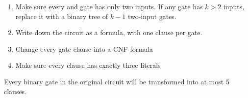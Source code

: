 \begin{enumerate}
	\item Make sure every  and  gate has only two inputs. If any gate has $k > 2$ inputs, replace it with a binary tree of $k - 1$ two-input gates.
	\item Write down the circuit as a formula, with one clause per gate.
	\item Change every gate clause into a CNF formula
	\item Make sure every clause has exactly three literals
\end{enumerate}

Every binary gate in the original circuit will be transformed into at most 5 clauses.